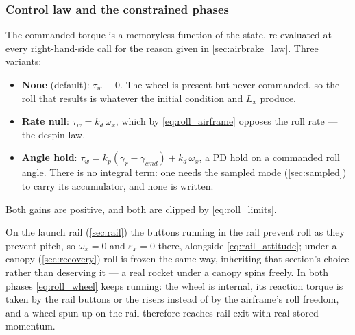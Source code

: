 \begin{aitext}
\subsubsection{Control law and the constrained phases}\label{sec:roll_law}
The commanded torque is a memoryless function of the state, re-evaluated at every right-hand-side
call for the reason given in \autoref{sec:airbrake_law}. Three variants:
\begin{itemize}
    \item \textbf{None} (default): $\tau_w\equiv0$. The wheel is present but never commanded, so
    the roll that results is whatever the initial condition and $L_x$ produce.
    \item \textbf{Rate null}: $\tau_w=k_d\,\omega_x$, which by \autoref{eq:roll_airframe} opposes
    the roll rate --- the despin law.
    \item \textbf{Angle hold}: $\tau_w=k_p\left(\gamma_r-\gamma_{cmd}\right)+k_d\,\omega_x$, a PD
    hold on a commanded roll angle. There is no integral term: one needs the sampled mode
    (\autoref{sec:sampled}) to carry its accumulator, and none is written.
\end{itemize}
Both gains are positive, and both are clipped by \autoref{eq:roll_limits}.

On the launch rail (\autoref{sec:rail}) the buttons running in the rail prevent roll as they
prevent pitch, so $\omega_x=0$ and $\varepsilon_x=0$ there, alongside
\autoref{eq:rail_attitude}; under a canopy (\autoref{sec:recovery}) roll is frozen the same way,
inheriting that section's choice rather than deserving it --- a real rocket under a canopy spins
freely. In both phases \autoref{eq:roll_wheel} keeps running: the wheel is internal, its reaction
torque is taken by the rail buttons or the risers instead of by the airframe's roll freedom, and a
wheel spun up on the rail therefore reaches rail exit with real stored momentum.
\end{aitext}
